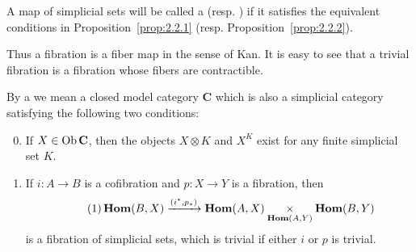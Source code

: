\documentclass[../main]{subfiles}
\begin{document}
\begin{definition}\label{def:2.2.1}
    A map of simplicial sets will be called a  (resp. ) if it satisfies the equivalent conditions in Proposition~\ref{prop:2.2.1} (resp. Proposition~\ref{prop:2.2.2}).
\end{definition}
Thus a fibration is a fiber map in the sense of Kan. It is easy to see that a trivial fibration is a fibration whose fibers are contractible. 
\begin{definition}
    By a  we mean a closed model category $\mathbf{C}$ which is also a simplicial category satisfying the following two conditions: 
    \begin{enumerate}[label = SM\arabic*]
    \setcounter{enumi}{-1}
        \item\label{SM0} \label{def:closedsimplicialcat_SM0} If $X \in \operatorname{Ob} \mathbf{C}$, then the objects $X \otimes K$ and $X^K$ exist for any finite simplicial set $K$.\setcounter{enumi}{6}
        \item\label{SM7} \label{def:closedsimplicialcat_SM7} If $i \colon A \longrightarrow  B$ is a cofibration and $p \colon X \longrightarrow  Y$ is a fibration, then 
        \[\tag{1}\label{eq:2.2.1}
            \operatorname{\mathbf{Hom}}(B,X) \xrightarrow{(i^*,p_*)} \operatorname{\mathbf{Hom}}(A,X)\underset{\operatorname{\mathbf{Hom}}(A,Y)}{\times}\operatorname{\mathbf{Hom}}(B,Y)
        \]
        is a fibration of simplicial sets, which is trivial if either $i$ or $p$ is trivial.
    \end{enumerate}
\end{definition}
\end{document}
